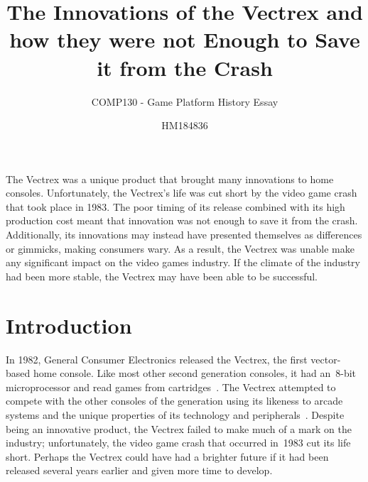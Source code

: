 \documentclass{scrartcl}
\title{The Innovations of the Vectrex and how they were not Enough to Save it from the Crash}
\subtitle{COMP130 - Game Platform History Essay}
\author{HM184836}
\begin{document}
\maketitle


\abstract
{
The Vectrex was a unique product that brought many innovations to home consoles. Unfortunately, the Vectrex's life was cut short by the video game crash that took place in 1983. The poor timing of its release combined with its high production cost meant that innovation was not enough to save it from the crash. Additionally, its innovations may instead have presented themselves as differences or gimmicks, making consumers wary. As a result, the Vectrex was unable make any significant impact on the video games industry. If the climate of the industry had been more stable, the Vectrex may have been able to be successful.

}



\section*{Introduction}
In 1982, General Consumer Electronics released the Vectrex, the first vector-based home console. Like most other second generation consoles, it had an~8-bit microprocessor and read games from cartridges~\cite{vectrex:manual}. The Vectrex attempted to compete with the other consoles of the generation using its likeness to arcade systems and the unique properties of its technology and peripherals~\cite{vectrex:advert}. Despite being an innovative product, the Vectrex failed to make much of a mark on the industry; unfortunately, the video game crash that occurred in~1983 cut its life short. Perhaps the Vectrex could have had a brighter future if it had been released several years earlier and given more time to develop.

\end{document}
